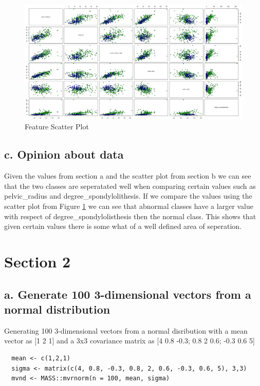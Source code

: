 \documentclass{report}
\begin{document}
\begin{figure}[h!]
  \includegraphics[width=\linewidth]{FeatureScatterPlot.png}
  \caption{Feature Scatter Plot}
  \label{fig:FeatureScatterPlot}
\end{figure}

\section{c. Opinion about data}

Given the values from section a and the scatter plot from section b we can see that the two classes are seperatated well when comparing certain values such as pelvic\_radius and degree\_spondylolithesis. If we compare the values using the scatter plot from Figure \ref{fig:FeatureScatterPlot} we can see that abnormal classes have a larger value with respect of degree\_spondylolisthesis then the normal class. This shows that given certain values there is some what of a well defined area of seperation.

\chapter{Section 2}

\section{a. Generate 100 3-dimensional vectors from a normal distribution}

Generating 100 3-dimensional vectors from a normal disribution with a mean vector as [1 2 1] and a 3x3 covariance matrix as [4  0.8 -0.3; 0.8 2 0.6; -0.3 0.6 5]

\begin{verbatim}
  mean <- c(1,2,1)
  sigma <- matrix(c(4, 0.8, -0.3, 0.8, 2, 0.6, -0.3, 0.6, 5), 3,3)
  mvnd <- MASS::mvrnorm(n = 100, mean, sigma)
\end{verbatim}
\end{document}
